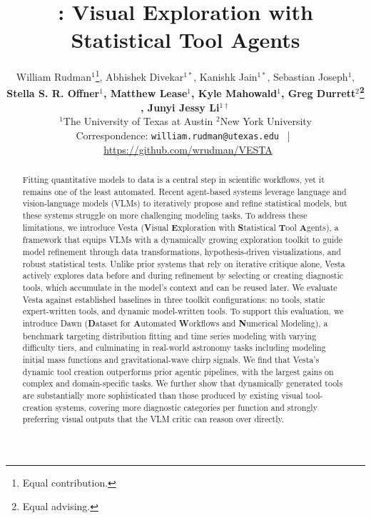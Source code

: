 \documentclass{article}
\title{\method{}: Visual Exploration with Statistical Tool Agents}
\author{%
  William Rudman$^1$\thanks{Equal contribution.}, Abhishek Divekar$^{1*}$, Kanishk Jain$^{1*}$, Sebastian Joseph$^1$, \\
  \textbf{Stella S. R. Offner$^1$, Matthew Lease$^1$, Kyle Mahowald$^1$, Greg Durrett$^{2}$\thanks{Equal advising.} , Junyi Jessy Li$^{1\dagger}$} \\[0.5em]
  $^1$The University of Texas at Austin \quad $^2$New York University \\[0.3em]
  \small Correspondence: \texttt{william.rudman@utexas.edu} \, | \,
  \faGithub\ \small\url{https://github.com/wrudman/VESTA}
}
\newcommand{\method}{{\sc Vesta}}
\newcommand{\methodfull}{\textbf{V}isual \textbf{E}xploration with \textbf{S}tatistical
\textbf{T}ool \textbf{A}gents}
\newcommand{\data}{{\sc Dawn}}
\newcommand{\datafull}{\textbf{D}ataset for \textbf{A}utomated \textbf{W}orkflows and \textbf{N}umerical Modeling}
\begin{document}
\maketitle







\begin{abstract}
Fitting quantitative models to data is a central step in scientific workflows, yet it remains one of the least automated. Recent agent-based systems leverage language and vision-language models (VLMs) to iteratively propose and refine statistical models, but these systems struggle on more challenging modeling tasks. To address these limitations, we introduce \method{} (\methodfull{}), a framework that equips VLMs with a dynamically growing exploration toolkit to guide model refinement through data transformations, hypothesis-driven visualizations, and robust statistical tests. Unlike prior systems that rely on iterative critique alone, \method{} actively explores data before and during refinement by selecting or creating diagnostic tools, which accumulate in the model's context and can be reused later. We evaluate \method{} against established baselines in three toolkit configurations: no tools, static expert-written tools, and dynamic model-written tools. 
To support this evaluation, we introduce \data{} (\datafull{}), a benchmark targeting distribution fitting and time series modeling with varying difficulty tiers, and culminating in real-world astronomy tasks including modeling initial mass functions and gravitational-wave chirp signals. We find that \method{}'s dynamic tool creation outperforms prior agentic pipelines, with the largest gains on complex and domain-specific tasks. We further show that dynamically generated tools are substantially more sophisticated than those produced by existing visual tool-creation systems, covering more diagnostic categories per function and strongly preferring visual outputs that the VLM critic can reason over directly.
\end{abstract}
\end{document}
